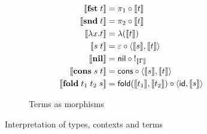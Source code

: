 \begin{figure}
\begin{subfigure}{0.8\linewidth}
\begin{minipage}{0.5\linewidth}
  \small
  \begin{align*}
  \sem{\tmFst{t}} &= \pi_1 \comp \sem{t}
  \\
  \sem{\tmSnd{t}} &= \pi_2 \comp \sem{t}
  \\
  \sem{\tmFun{x}{t}} &= \lambda(\sem{t})
  \\
  \sem{\tmApp{s}{t}} &= \eval \comp \prodM{\sem{s}}{\sem{t}}
  \\
  \sem{\tmNil} &= \nil \comp {!_{\sem{\Gamma}}}
  \\
  \sem{\tmCons{s}{t}} &= \cons \comp \prodM{\sem{s}}{\sem{t}}
  \\
  \sem{\tmFoldList{t_1}{t_2}{s}} &= \fold(\sem{t_1},\sem{t_2}) \comp \prodM{\id}{\sem{s}}
  \end{align*}
  \end{minipage}
  \caption{Terms as morphisms}
  \label{fig:semantics:terms}
\end{subfigure}
\caption{Interpretation of types, contexts and terms} %
\end{figure}
